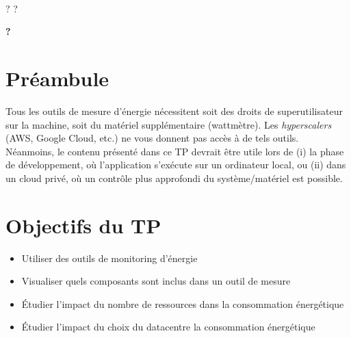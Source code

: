 \documentclass[a4paper,10pt]{article}
\newcommand{\tdtitle}{?}
\newcommand{\tdnumber}{?}
\newcommand{\tdlongtitle}{?}
\renewcommand{\maketitle}{%
  ~\\
  \begin{center}
    {\huge \tdtitle{} \tdnumber{} 
    }%
  \end{center}
  \vspace{.3cm}
  \begin{center}
    {\LARGE \textbf \tdlongtitle 
    }%
  \end{center}
  \vspace{.5cm}
}
\begin{document}
\renewcommand{\labelitemi}{$\bullet$}

\maketitle



\section*{Préambule}
Tous les outils de mesure d'énergie nécessitent soit des droits de
superutilisateur sur la machine, soit du matériel supplémentaire (wattmètre).
Les \textit{hyperscalers} (AWS, Google Cloud, etc.) ne vous donnent pas accès à
de tels outils. Néanmoins, le contenu présenté dans ce TP devrait être utile
lors de (i) la phase de développement, où l'application s'exécute sur un
ordinateur local, ou (ii) dans un cloud privé, où un contrôle plus approfondi du
système/matériel est possible.


\section{Objectifs du TP}

\begin{itemize}
  \item Utiliser des outils de monitoring d’énergie
  \item Visualiser quels composants sont inclus dans un outil de mesure
  \item Étudier l’impact du nombre de ressources dans la consommation énergétique
  \item Étudier l’impact du choix du datacentre la consommation énergétique 
\end{itemize}





\end{document}
